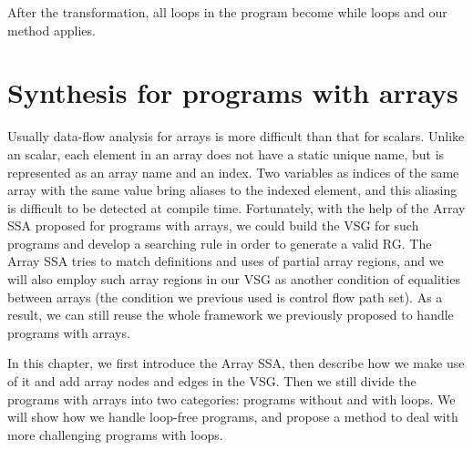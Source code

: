 \documentclass[12pt]{gatech-thesis}
\begin{document}
After the transformation, all loops in the program become while loops and our method applies.







\chapter{Synthesis for programs with arrays}

Usually data-flow analysis for arrays is more difficult than that for scalars. 
Unlike an scalar, each element in an array does not have a static unique name, but is represented as an array name and an index. 
Two variables as indices of the same array with the same value bring aliases to the indexed element, and this aliasing is difficult to be detected at compile time. 
Fortunately, with the help of the Array SSA \cite{Rus} proposed for programs with arrays, we could build the VSG for such programs and develop a searching rule in order to generate a valid RG. 
The Array SSA tries to match definitions and uses of partial array regions, and we will also employ such array regions in our VSG as another condition of equalities between arrays (the condition we previous used is  control flow path set). 
As a result, we can still reuse the whole framework we previously proposed  to handle programs with arrays.

In this chapter, we first introduce the Array SSA, then describe how we make use of it and add array nodes and edges in the VSG. Then we still divide the programs with arrays into two categories: programs without and with loops. 
We will show how we handle loop-free programs, and propose a method to deal with more challenging programs with loops.
\end{document}
